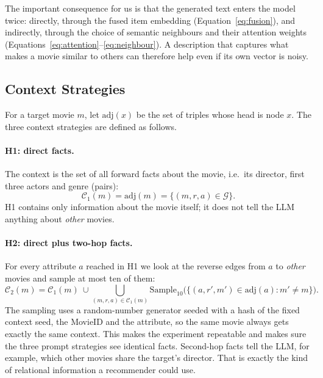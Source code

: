 \documentclass[a4paper,11pt]{article}
\begin{document}
The important consequence for us is that the generated text enters the model twice: directly, through the fused item embedding (Equation~\ref{eq:fusion}), and indirectly, through the choice of semantic neighbours and their attention weights (Equations~\ref{eq:attention}--\ref{eq:neighbour}). A description that captures what makes a movie similar to others can therefore help even if its own vector is noisy.

\subsection{Context Strategies}
\label{sec:contexts}
For a target movie $m$, let $\mathrm{adj}(x)$ be the set of triples whose head is node $x$. The three context strategies are defined as follows.

\paragraph{H1: direct facts.} The context is the set of all forward facts about the movie, i.e.\ its director, first three actors and genre (pairs):
\begin{equation}
\mathcal{C}_1(m) = \mathrm{adj}(m) = \{(m,r,a)\in\mathcal{G}\}.
\end{equation}
H1 contains only information about the movie itself; it does not tell the LLM anything about \emph{other} movies.

\paragraph{H2: direct plus two-hop facts.} For every attribute $a$ reached in H1 we look at the reverse edges from $a$ to \emph{other} movies and sample at most ten of them:
\begin{equation}
\mathcal{C}_2(m) = \mathcal{C}_1(m)\ \cup \bigcup_{(m,r,a)\in\mathcal{C}_1(m)} \mathrm{Sample}_{10}\big(\{(a,r',m')\in\mathrm{adj}(a) : m'\neq m\}\big).
\end{equation}
The sampling uses a random-number generator seeded with a hash of the fixed context seed, the MovieID and the attribute, so the same movie always gets exactly the same context. This makes the experiment repeatable and makes sure the three prompt strategies see identical facts. Second-hop facts tell the LLM, for example, which other movies share the target's director. That is exactly the kind of relational information a recommender could use.
\end{document}
